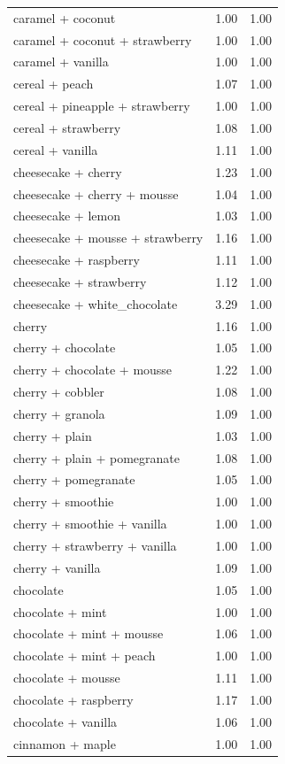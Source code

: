 \begin{table}
\begin{tabular}{lrr}
caramel + coconut & 1.00 & 1.00 \\
caramel + coconut + strawberry & 1.00 & 1.00 \\
caramel + vanilla & 1.00 & 1.00 \\
cereal + peach & 1.07 & 1.00 \\
cereal + pineapple + strawberry & 1.00 & 1.00 \\
cereal + strawberry & 1.08 & 1.00 \\
cereal + vanilla & 1.11 & 1.00 \\
cheesecake + cherry & 1.23 & 1.00 \\
cheesecake + cherry + mousse & 1.04 & 1.00 \\
cheesecake + lemon & 1.03 & 1.00 \\
cheesecake + mousse + strawberry & 1.16 & 1.00 \\
cheesecake + raspberry & 1.11 & 1.00 \\
cheesecake + strawberry & 1.12 & 1.00 \\
cheesecake + white\_chocolate & 3.29 & 1.00 \\
cherry & 1.16 & 1.00 \\
cherry + chocolate & 1.05 & 1.00 \\
cherry + chocolate + mousse & 1.22 & 1.00 \\
cherry + cobbler & 1.08 & 1.00 \\
cherry + granola & 1.09 & 1.00 \\
cherry + plain & 1.03 & 1.00 \\
cherry + plain + pomegranate & 1.08 & 1.00 \\
cherry + pomegranate & 1.05 & 1.00 \\
cherry + smoothie & 1.00 & 1.00 \\
cherry + smoothie + vanilla & 1.00 & 1.00 \\
cherry + strawberry + vanilla & 1.00 & 1.00 \\
cherry + vanilla & 1.09 & 1.00 \\
chocolate & 1.05 & 1.00 \\
chocolate + mint & 1.00 & 1.00 \\
chocolate + mint + mousse & 1.06 & 1.00 \\
chocolate + mint + peach & 1.00 & 1.00 \\
chocolate + mousse & 1.11 & 1.00 \\
chocolate + raspberry & 1.17 & 1.00 \\
chocolate + vanilla & 1.06 & 1.00 \\
cinnamon + maple & 1.00 & 1.00 \\

\end{tabular}
\end{table}
